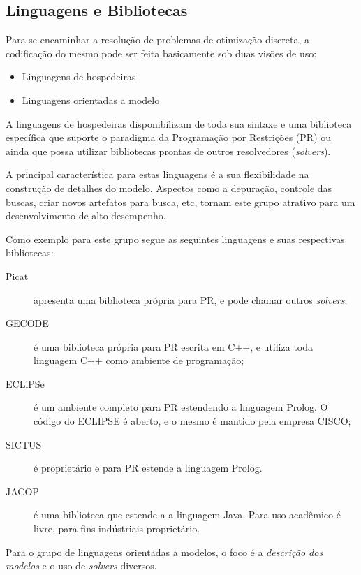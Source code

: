 \subsection{Linguagens e Bibliotecas}

Para se encaminhar a resolução de problemas de otimização discreta, a codificação do mesmo pode ser feita basicamente sob duas visões de uso:

\begin{itemize}
  \item Linguagens de hospedeiras
  \item Linguagens orientadas a modelo
\end{itemize}

A linguagens de hospedeiras disponibilizam de toda sua sintaxe
e uma biblioteca específica que suporte o paradigma da Programação por Restrições (PR) ou ainda que possa utilizar bibliotecas prontas
de outros resolvedores (\textit{solvers}). 

A principal característica para estas linguagens é a sua flexibilidade na construção de detalhes do modelo. Aspectos como a depuração, controle das buscas, criar novos artefatos para busca, etc, tornam este grupo atrativo para um desenvolvimento de alto-desempenho.

Como exemplo para este grupo segue as seguintes linguagens e suas respectivas bibliotecas:

\begin{description}
  \item[Picat] apresenta uma biblioteca própria para PR, e pode chamar outros \textit{solvers};
  
    \item[GECODE] é uma biblioteca própria para PR escrita em C++, e utiliza toda linguagem C++ como ambiente de programação;
  
   \item[ECLiPSe] é um ambiente completo para PR estendendo a linguagem Prolog. O código do ECLIPSE é aberto, e o mesmo é mantido pela empresa CISCO;
  
  \item[SICTUS] é proprietário e para PR estende a linguagem Prolog.

  \item[JACOP] é uma biblioteca que estende a  a linguagem Java. Para   uso acadêmico é livre, para fins indústriais proprietário.
    
\end{description}

Para o  grupo de linguagens orientadas a modelos, o foco
é a \textit{descrição dos modelos} e o uso de \textit{solvers} diversos.


